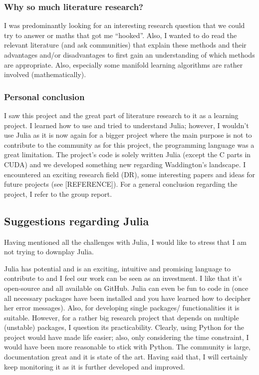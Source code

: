 \documentclass[journal, a4paper]{IEEEtran}
\begin{document}
\subsubsection{Why so much literature research?}
I was predominantly looking for an interesting research question that we could try to answer or maths that got me “hooked”. Also, I wanted to do read the relevant literature (and ask communities) that explain these methods and their advantages and/or disadvantages to first gain an understanding of which methods are appropriate. Also, especially some manifold learning algorithms are rather involved (mathematically).

\subsubsection{Personal conclusion}
I saw this project and the great part of literature research to it as a learning project. I learned how to use and tried to understand Julia; however, I wouldn’t use Julia as it is now again for a bigger project where the main purpose is not to contribute to the community as for this project, the programming language was a great limitation.
The project’s code is solely written Julia (except the C parts in CUDA) and we developed something new regarding Waddington’s landscape. I encountered an exciting research field (DR), some interesting papers and ideas for future projects (see [REFERENCE]).
For a general conclusion regarding the project, I refer to the group report.



\appendix 

\subsection{Suggestions regarding Julia}\label{suggestionsjulia}
Having mentioned all the challenges with Julia, I would like to stress that I am not trying to downplay Julia. 

Julia has potential and is an exciting, intuitive and promising language to contribute to and I feel our work can be seen as an investment. I like that it's open-source and all available on GitHub. Julia can even be fun to code in (once all necessary packages have been installed and you have learned how to decipher her error messages). Also, for developing single packages/ functionalities it is suitable. However, for a rather big research project that depends on multiple (unstable) packages, I question its practicability.
Clearly, using Python for the project would have made life easier; also, only considering the time constraint, I would have been more reasonable to stick with Python. The community is large, documentation great and it is state of the art. 
Having said that, I will certainly keep monitoring it as it is further developed and improved. \\
\end{document}
